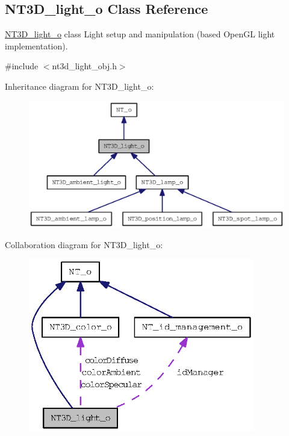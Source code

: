 \subsection{NT3D\_\-light\_\-o Class Reference}
\label{class_n_t3_d__light__o}


\hyperlink{class_n_t3_d__light__o}{NT3D\_\-light\_\-o} class Light setup and manipulation (based OpenGL light implementation).  




{\ttfamily \#include $<$nt3d\_\-light\_\-obj.h$>$}



Inheritance diagram for NT3D\_\-light\_\-o:
\nopagebreak
\begin{figure}[H]
\begin{center}
\leavevmode
\includegraphics[width=400pt]{class_n_t3_d__light__o__inherit__graph}
\end{center}
\end{figure}


Collaboration diagram for NT3D\_\-light\_\-o:
\nopagebreak
\begin{figure}[H]
\begin{center}
\leavevmode
\includegraphics[width=280pt]{class_n_t3_d__light__o__coll__graph}
\end{center}
\end{figure}
